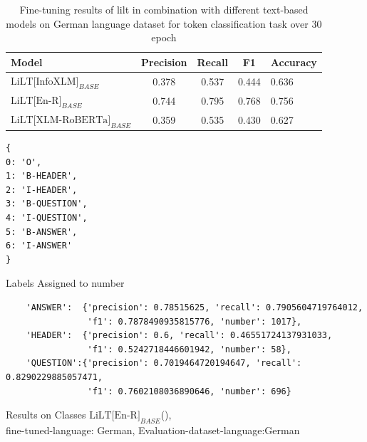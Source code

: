 \begin{table}[!ht]
    \centering
    \captionsetup{justification=centering}
    \begin{tabular}{lcccl}
        \toprule
        \textbf{Model}& \textbf{Precision}& \textbf{Recall}& \textbf{F1} & \textbf{Accuracy}\\ \midrule
        \(\text{LiLT[InfoXLM]}_{BASE}\)& 0.378& 0.537& 0.444& 0.636 \\ \midrule
         \(\text{LiLT[En-R]}_{BASE}\) &  0.744& 0.795& 0.768& 0.756 \\
         \(\text{LiLT[XLM-RoBERTa]}_{BASE}\)& 0.359& 0.535& 0.430& 0.627 \\ \bottomrule
    \end{tabular}
    \caption{Fine-tuning results of \acrshort{lilt} in combination with different text-based models on German language dataset for token classification task over 30 epoch}
    \label{tab:30_epoch_results}
\end{table}

\begin{listing}[!ht]

\begin{verbatim}
{
0: 'O', 
1: 'B-HEADER', 
2: 'I-HEADER', 
3: 'B-QUESTION', 
4: 'I-QUESTION', 
5: 'B-ANSWER', 
6: 'I-ANSWER'
}
\end{verbatim}
\caption{Labels Assigned to number}
\label{multi_class}
\end{listing}


\begin{listing}[!ht]
\captionsetup{justification=centering}
\begin{verbatim}
    'ANSWER':  {'precision': 0.78515625, 'recall': 0.7905604719764012,
                'f1': 0.7878490935815776, 'number': 1017},
    'HEADER':  {'precision': 0.6, 'recall': 0.46551724137931033,
                'f1': 0.5242718446601942, 'number': 58},
    'QUESTION':{'precision': 0.7019464720194647, 'recall': 0.8290229885057471,
                'f1': 0.7602108036890646, 'number': 696}
\end{verbatim}
\caption{Results on Classes \(\text{LiLT[En-R]}_{BASE}\)(), \\ fine-tuned-language: German, Evaluation-dataset-language:German }
\label{Listing:main_Classes_res_30_epoch}
\end{listing}

